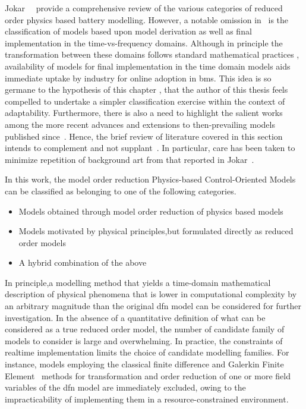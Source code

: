 Jokar~\etal~\cite{Jokar2016} provide a comprehensive review of the various categories of reduced order physics based
battery modelling. However, a notable omission in~\cite{Jokar2016} is the classification of models based upon model
derivation as well as final implementation in the time-vs-frequency domains. Although in principle the transformation
between these domains follows standard mathematical practices , availability of models for final
implementation in the time domain models aids immediate uptake by industry for online adoption in \gls{bms}. This idea
is so germane to the hypothesis of this chapter , that the author of this thesis feels compelled to undertake a simpler classification exercise within the context
of adaptability. Furthermore, there is also a need to highlight the salient works among the more recent advances and
extensions to then-prevailing models published since~\cite{Jokar2016}. Hence, the brief review of literature
covered in this section intends to complement and not supplant~\cite{Jokar2016}. In particular, care has been taken to
minimize repetition of background art from that reported in Jokar~\etal{}.

In this work, the model order reduction Physics-based Control-Oriented Models can be classified as belonging to one of the
following categories.

\begin{itemize}
    \item Models obtained through model order reduction of physics based models
    \item Models motivated by physical principles,but formulated directly as reduced order models
    \item A hybrid combination of the above
\end{itemize}

In principle,a modelling method that yields a time-domain mathematical description of physical phenomena that is lower
in computational complexity by an arbitrary magnitude than the original \gls{dfn} model can be considered for further
investigation. In the absence of a quantitative definition of what can be considered as a true reduced order model, the
number of candidate family of models to consider is large and overwhelming. In practice, the constraints of realtime
implementation limits the choice of candidate modelling families. For instance, models employing the classical finite
difference and Galerkin Finite Element~\cite{Dao2012} methods for transformation and order reduction of one or more field variables of
the \gls{dfn} model are immediately excluded, owing to the impracticability of implementing them in a
resource-constrained environment.

